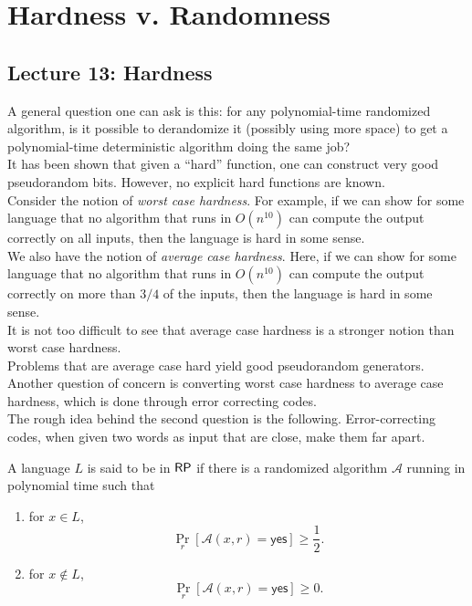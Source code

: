 \section{Hardness v. Randomness}

	\subsection{Lecture 13: Hardness}

		A general question one can ask is this: for any polynomial-time randomized algorithm, is it possible to derandomize it (possibly using more space) to get a polynomial-time deterministic algorithm doing the same job?\\
		It has been shown that given a ``hard'' function, one can construct very good pseudorandom bits. However, no explicit hard functions are known.\\

		Consider the notion of \emph{worst case hardness}. For example, if we can show for some language that no algorithm that runs in $O(n^{10})$ can compute the output correctly on all inputs, then the language is hard in some sense.\\
		We also have the notion of \emph{average case hardness}. Here, if we can show for some language that no algorithm that runs in $O(n^{10})$ can compute the output correctly on more than $3/4$ of the inputs, then the language is hard in some sense.\\
		It is not too difficult to see that average case hardness is a stronger notion than worst case hardness.\\

		Problems that are average case hard yield good pseudorandom generators. Another question of concern is converting worst case hardness to average case hardness, which is done through error correcting codes.\\
		The rough idea behind the second question is the following. Error-correcting codes, when given two words as input that are close, make them far apart.

		\begin{fdef}[$\RP$]
			A language $L$ is said to be in $\RP$ if there is a randomized algorithm $\mathcal{A}$ running in polynomial time such that
			\begin{enumerate}
				\item for $x \in L$,
				\[ \Pr_{r} \left[\mathcal{A}(x,r) = \mathsf{yes}\right] \ge \frac{1}{2}. \]
				\item for $x \not\in L$,
				\[ \Pr_{r} \left[\mathcal{A}(x,r) = \mathsf{yes}\right] \ge 0. \]
			\end{enumerate}
		\end{fdef}

